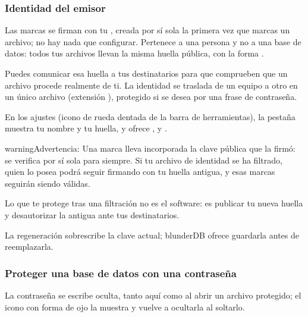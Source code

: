 \documentclass[letterpaper,10pt,spanish]{sphinxmanual}
\begin{document}
\subsubsection{Identidad del emisor}
\label{\detokenize{manuel:identite-d-emetteur}}
\sphinxAtStartPar
Las marcas se firman con tu , creada por sí sola la primera vez que marcas un archivo; no hay nada que configurar. Pertenece a una persona y no a una base de datos: todos tus archivos llevan la misma huella pública, con la forma .

\sphinxAtStartPar
Puedes comunicar esa huella a tus destinatarios para que comprueben que un archivo procede realmente de ti. La identidad se traslada de un equipo a otro en un único archivo (extensión ), protegido si se desea por una frase de contraseña. 

\sphinxAtStartPar
En los ajustes (icono de rueda dentada de la barra de herramientas), la pestaña  muestra tu nombre y tu huella, y ofrece ,  y .

\begin{sphinxadmonition}{warning}{Advertencia:}
\sphinxAtStartPar
{} Una marca lleva incorporada la clave pública que la firmó: se verifica por sí sola para siempre. Si tu archivo de identidad se ha filtrado, quien lo posea podrá seguir firmando con tu huella antigua, y esas marcas seguirán siendo válidas.

\sphinxAtStartPar
Lo que te protege tras una filtración no es el software: es publicar tu nueva huella y desautorizar la antigua ante tus destinatarios.

\sphinxAtStartPar
La regeneración sobrescribe la clave actual; blunderDB ofrece guardarla antes de reemplazarla.
\end{sphinxadmonition}


\subsubsection{Proteger una base de datos con una contraseña}
\label{\detokenize{manuel:proteger-une-base-par-un-mot-de-passe}}
\sphinxAtStartPar
La contraseña se escribe oculta, tanto aquí como al abrir un archivo protegido; el icono con forma de ojo la muestra  y vuelve a ocultarla al soltarlo.
\end{document}
